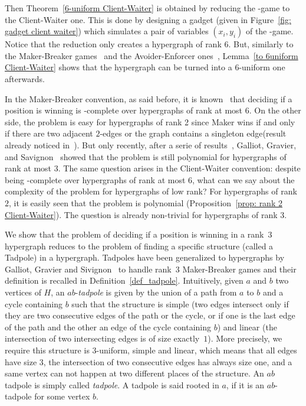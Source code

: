 \documentclass{article}
\newcommand{\PS}{\lang{Paired~SAT}\xspace}
\newcommand{\hedge}{edge\xspace}
\newcommand{\hedges}{edges\xspace}
\begin{document}
Then Theorem~\ref{6-uniform Client-Waiter} is obtained by reducing the \PS-game to the Client-Waiter one. This is done by designing a gadget (given in Figure~\ref{fig: gadget client waiter}) which simulates a pair of variables \((x_i,y_i)\) of the \PS-game. Notice that the reduction only creates a hypergraph of rank \(6\). But, similarly to the Maker-Breaker games~\cite[Corollary~4]{RW21} and the Avoider-Enforcer ones~\cite[Lemma~7]{GO23}, Lemma~\ref{to 6uniform Client-Waiter} shows that the hypergraph can be turned into a \(6\)-uniform one afterwards. 

\medskip

In the Maker-Breaker convention, as said before, it is known~\cite{RW21} that deciding if a position is winning is \PSPACE-complete over hypergraphs of rank at most \(6\). On the other side, the problem is easy for hypergraphs of rank 2 since Maker wins if and only if there are two adjacent \(2\)-edges or the graph contains a singleton \hedge (result already noticed in~\cite{Kut05}). But only recently, after a serie of results~\cite{Kut05, RW20}, Galliot, Gravier, and Savignon~\cite{Gal23thesis, GGS22} showed that the problem is still polynomial for hypergraphs of rank at most \(3\).
The same question arises in the Client-Waiter convention: despite being \PSPACE-complete over hypergraphs of rank at most \(6\), what can we say about the complexity of the problem for hypergraphs of low rank? For hypergraphs of rank \(2\), it is easily seen that the problem is polynomial (Proposition~\ref{prop: rank 2 Client-Waiter}). The question is already non-trivial for hypergraphs of rank \(3\). 

We show that the problem of deciding if a position is winning in a rank~\(3\) hypergraph reduces to the problem of finding a specific structure (called a Tadpole) in a hypergraph.
Tadpoles have been generalized to hypergraphs by Galliot, Gravier and Sivignon~\cite{GGS22} to handle rank~3 Maker-Breaker games and their definition is recalled in Definition~\ref{def_tadpole}. Intuitively, given \(a\) and \(b\) two vertices of \(H\), an \(ab\)-{\em tadpole} is given by the union of a path from \(a\) to \(b\) and a cycle containing \(b\) such that the structure is simple (two \hedges intersect only if they are two consecutive \hedges of the path or the cycle, or if one is the last \hedge of the path and the other an \hedge of the cycle containing \(b\)) and linear (the intersection of two intersecting \hedges is of size exactly~\(1\)). More precisely, we require this structure is \(3\)-uniform, simple and linear, which means that all edges have size \(3\), the intersection of two consecutive edges has always size one, and a same vertex can not happen at two different places of the structure. An \(ab\) tadpole is simply called {\em tadpole}. A tadpole is said rooted in \(a\), if it is an \(ab\)-tadpole for some vertex \(b\).
\end{document}
